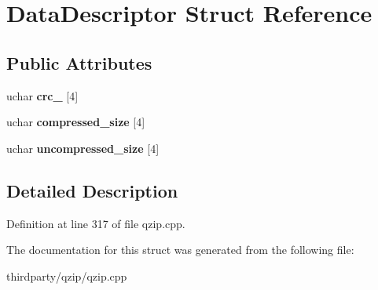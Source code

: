 \hypertarget{struct_data_descriptor}{}\section{Data\+Descriptor Struct Reference}
\label{struct_data_descriptor}
\subsection*{Public Attributes}
\begin{DoxyCompactItemize}
\item 
\mbox{\label{struct_data_descriptor_a5dc552b1a9a57e823e34563fad793ff7}} 
uchar {\bfseries crc\+\_} \mbox{[}4\mbox{]}
\item 
\mbox{\label{struct_data_descriptor_aee02c797bb95655816ff539ad971044a}} 
uchar {\bfseries compressed\+\_\+size} \mbox{[}4\mbox{]}
\item 
\mbox{\label{struct_data_descriptor_a304d493d64706216dd556e591cbb2fc5}} 
uchar {\bfseries uncompressed\+\_\+size} \mbox{[}4\mbox{]}
\end{DoxyCompactItemize}


\subsection{Detailed Description}


Definition at line 317 of file qzip.\+cpp.



The documentation for this struct was generated from the following file\+:\begin{DoxyCompactItemize}
\item 
thirdparty/qzip/qzip.\+cpp\end{DoxyCompactItemize}

